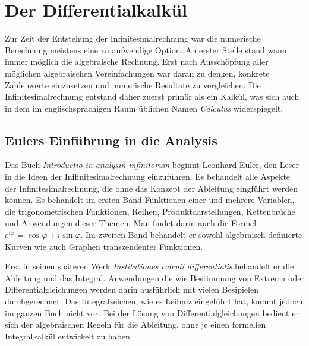 %
%
%
\section{Der Differentialkalkül}
Zur Zeit der Entstehung der Infinitesimalrechnung war die numerische
Berechnung meistens eine zu aufwendige Option.
An erster Stelle stand wann immer möglich die algebraische Rechnung.
Erst nach Ausschöpfung aller möglichen algebraischen Vereinfachungen
war daran zu denken, konkrete Zahlenwerte einzusetzen und numerische
Resultate zu vergleichen.
Die Infinitesimalrechnung entstand daher zuerst primär als ein Kalkül,
was sich auch in dem im englischsprachigen Raum üblichen Namen
\emph{Calculus} widerspiegelt.

%
%
\subsection{Eulers Einführung in die Analysis}
Das Buch \emph{Introductio in analysin infinitorum}
\cite{buch:introductio1,buch:introductio2}
beginnt Leonhard Euler, den Leser in die Ideen der Inifinitesimalrechnung
einzuführen.
%
Es behandelt alle Aspekte der Infinitesimalrechnung, die ohne das
Konzept der Ableitung eingführt werden können.
Es behandelt im ersten Band Funktionen einer und mehrere Variablen,
die trigonometrischen Funktionen, Reihen, Produktdarstellungen,
%
%
%
Kettenbrüche und Anwendungen dieser Themen.
%
Man findet darin auch die Formel $e^{i\varphi}=\cos\varphi+i\sin\varphi$.
Im zweiten Band \cite{buch:introductio2} behandelt er sowohl 
algebraisch definierte Kurven wie auch Graphen transzendenter
%
%
Funktionen.

Erst in seinen späteren Werk \emph{Institutiones calculi differentialis}
\cite{buch:institutiones} behandelt er die Ableitung und das Integral.
Anwendungen die wie Bestimmung von Extrema oder Differentialgleichungen
%
werden darin ausführlich mit vielen Besipielen durchgerechnet.
Das Integralzeichen, wie es Leibniz eingeführt hat, kommt jedoch im
%
ganzen Buch nicht vor.
Bei der Lösung von Differentialgleichungen bedient er sich der algebraischen
%
Regeln für die Ableitung, ohne je einen formellen Integralkalkül
entwickelt zu haben.

